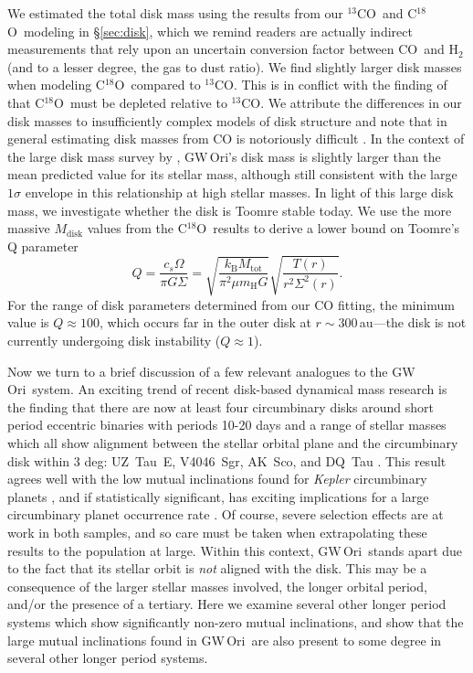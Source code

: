 \documentclass[twocolumn]{aastex61}
\newcommand{\obj}{GW\,Ori}
\newcommand{\twelve}{CO}
\newcommand{\thirteen}{${}^{13}$CO}
\newcommand{\eighteen}{C${}^{18}$O}
\begin{document}
We estimated the total disk mass using the results from our \thirteen\ and \eighteen\ modeling in \S\ref{sec:disk}, which we remind readers are actually indirect measurements that rely upon an uncertain conversion factor between \twelve\ and $\mathrm{H}_2$ (and to a lesser degree, the gas to dust ratio). We find slightly larger disk masses when modeling \eighteen\ compared to \thirteen. This is in conflict with the finding of \citet{fang17} that \eighteen\ must be depleted relative to \thirteen. We attribute the differences in our disk masses to insufficiently complex models of disk structure and note that in general estimating disk masses from CO is notoriously difficult \citep{yu17}. In the context of the large disk mass survey by \citet{andrews13}, \obj's disk mass is slightly larger than the mean predicted value for its stellar mass, although still consistent with the large $1\sigma$ envelope in this relationship at high stellar masses.
In light of this large disk mass, we investigate whether the disk is Toomre stable today. We use the more massive $M_\mathrm{disk}$ values from the \eighteen\ results to derive a lower bound on Toomre's Q parameter
\begin{equation}
Q = \frac{c_s \Omega}{\pi G \Sigma} = \sqrt{\frac{k_\mathrm{B} M_\mathrm{tot}}{\pi^2 \mu m_\mathrm{H} G}} \sqrt{\frac{T(r)}{r^2 \Sigma^2(r)}}.
\end{equation}
For the range of disk parameters determined from our CO fitting, the minimum value is $Q \approx 100$, which occurs far in the outer disk at $r \sim 300\,$au---the disk is not currently undergoing disk instability ($Q \approx 1$).

Now we turn to a brief discussion of a few relevant analogues to the \obj\ system. %
An exciting trend of recent disk-based dynamical mass research is the finding that there are now at least four circumbinary disks around short period eccentric binaries with periods 10-20 days and a range of stellar masses which all show alignment between the stellar orbital plane and the circumbinary disk within 3 deg: UZ~Tau~E, V4046~Sgr, AK~Sco, and DQ~Tau \citep{jensen07,rosenfeld12b,czekala15b,czekala16}. This result agrees well with the low mutual inclinations found for \emph{Kepler} circumbinary planets \citep{winn15}, and if statistically significant, has exciting implications for a large circumbinary planet occurrence rate \citep{li16}. Of course, severe selection effects are at work in both samples, and so care must be taken when extrapolating these results to the population at large. Within this context, \obj\ stands apart due to the fact that its stellar orbit is \emph{not} aligned with the disk. This may be a consequence of the larger stellar masses involved, the longer orbital period, and/or the presence of a tertiary. Here we examine several other longer period systems which show significantly non-zero mutual inclinations, and show that the large mutual inclinations found in \obj\ are also present to some degree in several other longer period systems.
\end{document}
